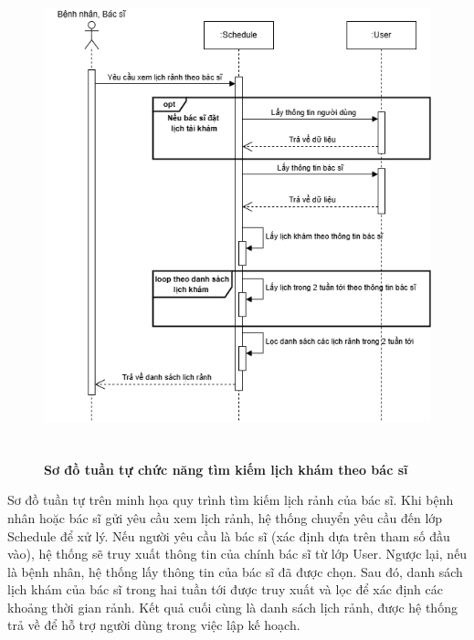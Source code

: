 \begin{figure}[H]
	\centering
	\includegraphics[width=14cm,height=14cm]{Images/sequence/schedule/getAvailableByDoctor.drawio.png}
	\caption[Sơ đồ tuần tự chức năng tìm kiếm lịch khám theo bác sĩ]{\bfseries \fontsize{12pt}{0pt}
		\selectfont Sơ đồ tuần tự chức năng tìm kiếm lịch khám theo bác sĩ}
	\label{sequence_by_doctor} %
\end{figure}
Sơ đồ tuần tự trên minh họa quy trình tìm kiếm lịch rảnh của bác sĩ. Khi bệnh nhân hoặc bác sĩ gửi yêu cầu xem lịch rảnh, hệ thống chuyển yêu cầu đến lớp Schedule để xử lý.
Nếu người yêu cầu là bác sĩ (xác định dựa trên tham số đầu vào), hệ thống sẽ truy xuất thông tin của chính bác sĩ từ lớp User. Ngược lại, nếu là bệnh nhân, hệ thống lấy thông tin của bác sĩ đã được chọn.
Sau đó, danh sách lịch khám của bác sĩ trong hai tuần tới được truy xuất và lọc để xác định các khoảng thời gian rảnh. Kết quả cuối cùng là danh sách lịch rảnh, được hệ thống trả về để hỗ trợ người dùng trong việc lập kế hoạch.

